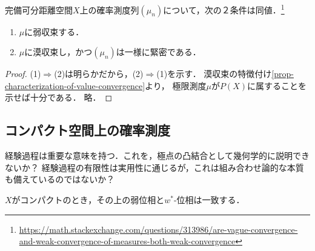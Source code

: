 \documentclass[uplatex,dvipdfmx]{jsreport}
\begin{document}
\begin{corollary}[漠収束の特徴付け]
    完備可分距離空間$X$上の確率測度列$(\mu_n)$について，次の２条件は同値．\footnote{\url{https://math.stackexchange.com/questions/313986/are-vague-convergence-and-weak-convergence-of-measures-both-weak-convergence}}
    \begin{enumerate}
        \item $\mu$に弱収束する．
        \item $\mu$に漠収束し，かつ$(\mu_n)$は一様に緊密である．
    \end{enumerate}
\end{corollary}
\begin{proof}
    (1)$\Rightarrow$(2)は明らかだから，(2)$\Rightarrow$(1)を示す．
    漠収束の特徴付け\ref{prop-characterization-of-value-convergence}より，
    極限測度$\mu$が$P(X)$に属することを示せば十分である．
    略．
\end{proof}

\subsection{コンパクト空間上の確率測度}

\begin{tcolorbox}[colframe=ForestGreen, colback=ForestGreen!10!white,breakable,colbacktitle=ForestGreen!40!white,coltitle=black,fonttitle=\bfseries\sffamily,
title=]
    経験過程は重要な意味を持つ．これを，極点の凸結合として幾何学的に説明できないか？
    経験過程の有限性は実用性に通じるが，これは組み合わせ論的な本質も備えているのではないか？

    $X$がコンパクトのとき，その上の弱位相と$w^*$-位相は一致する．
\end{tcolorbox}
\end{document}
